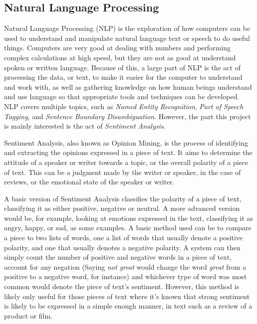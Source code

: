 \subsection{Natural Language Processing}
\label{sec:bck_NLP}
Natural Language Processing (NLP) is the exploration of how computers can be used to understand and manipulate natural language text or speech to do useful things\cite{chowdhury2003natural}. Computers are very good at dealing with numbers and performing complex calculations at high speed, but they are not as good at understand spoken or written language. Because of this, a large part of NLP is the act of processing the data, or text, to make it easier for the computer to understand and work with, as well as gathering knowledge on how human beings understand and use language so that appropriate tools and techniques can be developed\cite{chowdhury2003natural}. NLP covers multiple topics, such as \emph{Named Entity Recognition}, \emph{Part of Speech Tagging}, and \emph{Sentence Boundary Disambiguation}. However, the part this project is mainly interested is the act of \emph{Sentiment Analysis}.

Sentiment Analysis, also known as Opinion Mining, is the process of identifying and extracting the opinions expressed in a piece of text\cite{Liu2010}. It aims to determine the attitude of a speaker or writer towards a topic, or the overall polarity of a piece of text. This can be a judgment made by the writer or speaker, in the case of reviews, or the emotional state of the speaker or writer.

A basic version of Sentiment Analysis classifies the polarity of a piece of text, classifying it as either positive, negative or neutral. A more advanced version would be, for example, looking at emotions expressed in the text, classifying it as angry, happy, or sad, as some examples. A basic method used can be to compare a piece to two lists of words, one a list of words that usually denote a positive polarity, and one that usually denotes a negative polarity. A system can then simply count the number of positive and negative words in a piece of text, account for any negation (Saying \emph{not great} would change the word \emph{great} from a positive to a negative word, for instance) and whichever type of word was most common would denote the piece of text’s sentiment. However, this method is likely only useful for those pieces of text where it’s known that strong sentiment is likely to be expressed in a simple enough manner, in text such as a review of a product or film.

